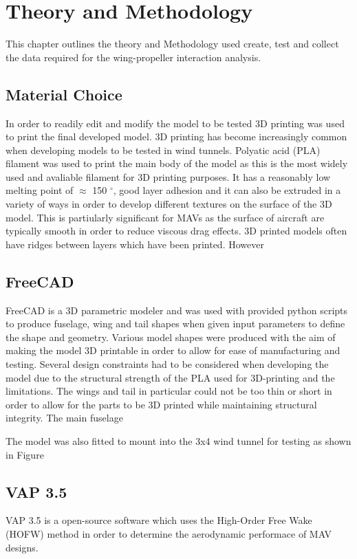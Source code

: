 \graphicspath{{./Figs/}}

\chapter{Theory and Methodology}
This chapter outlines the theory and Methodology used create, test and collect the data required for the wing-propeller interaction analysis. 

\section{Material Choice}
In order to readily edit and modify the model to be tested 3D printing was used to print the final developed model. 3D printing has become increasingly common when developing models to be tested in wind tunnels. Polyatic acid (PLA) filament was used to print the main body of the model as this is the most widely used and avaliable filament for 3D printing purposes. It has a reasonably low melting point of $\approx$ 150 $^{\circ}$, good layer adhesion and it can also be extruded in a variety of ways in order to develop different textures on the surface of the 3D model. This is partiularly significant for MAVs as the surface of aircraft are typically smooth in order to reduce viscous drag effects. 3D printed models often have ridges between layers which have been printed. However 


\section{FreeCAD}
FreeCAD is a 3D parametric modeler and was used with provided python scripts to produce fuselage, wing and tail shapes when given input parameters to define the shape and geometry. Various model shapes were produced with the aim of making the model 3D printable in order to allow for ease of manufacturing and testing. Several design constraints had to be considered when developing the model due to the structural strength of the PLA used for 3D-printing and the limitations. The wings and tail in particular could not be too thin or short in order to allow for the parts to be 3D printed while maintaining structural integrity. The main fuselage

The model was also fitted to mount into the 3x4 wind tunnel for testing as shown in Figure 

\section{VAP 3.5}
VAP 3.5 is a open-source software which uses the High-Order Free Wake (HOFW)  method in order to determine the aerodynamic performace of MAV designs. \\

